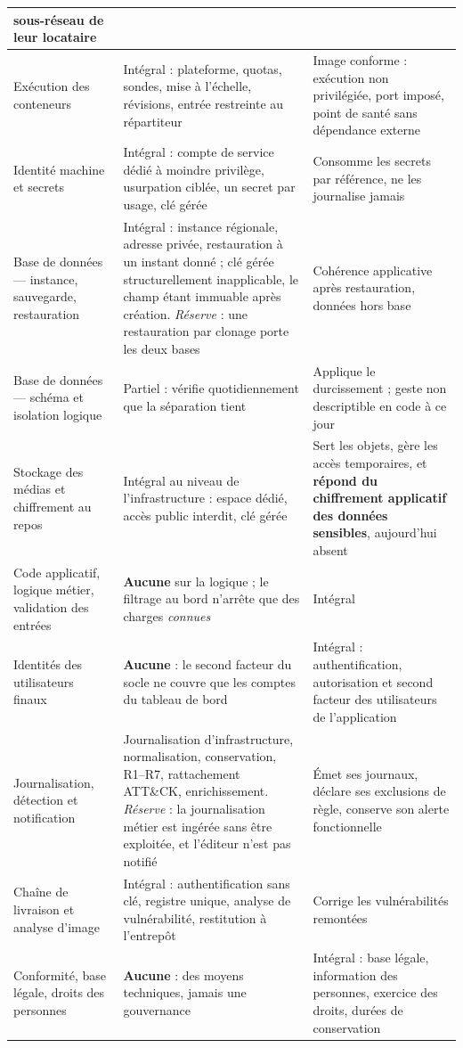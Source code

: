 {\begin{longtable}{|P{2.90cm}|P{6.25cm}|P{5.65cm}|}
sous-réseau de leur locataire \\ \hline
Exécution des conteneurs & Intégral : plateforme, quotas, sondes, mise à l'échelle, révisions,
entrée restreinte au répartiteur & Image conforme : exécution non privilégiée, port imposé, point
de santé sans dépendance externe \\ \hline
Identité machine et secrets & Intégral : compte de service dédié à moindre privilège, usurpation
ciblée, un secret par usage, clé gérée & Consomme les secrets par référence, ne les journalise
jamais \\ \hline
Base de données --- instance, sauvegarde, restauration & Intégral : instance régionale, adresse
privée, restauration à un instant donné ; clé gérée structurellement inapplicable, le champ étant
immuable après création. \emph{Réserve} : une restauration par clonage porte les deux bases &
Cohérence applicative après restauration, données hors base \\ \hline
Base de données --- schéma et isolation logique & Partiel : vérifie quotidiennement que la
séparation tient & Applique le durcissement ; geste non descriptible en code à ce jour \\ \hline
Stockage des médias et chiffrement au repos & Intégral au niveau de l'infrastructure : espace
dédié, accès public interdit, clé gérée & Sert les objets, gère les accès temporaires, et
\textbf{répond du chiffrement applicatif des données sensibles}, aujourd'hui absent \\ \hline
Code applicatif, logique métier, validation des entrées & \textbf{Aucune} sur la logique ; le
filtrage au bord n'arrête que des charges \emph{connues} & Intégral \\ \hline
Identités des utilisateurs finaux & \textbf{Aucune} : le second facteur du socle ne couvre que les
comptes du tableau de bord & Intégral : authentification, autorisation et second facteur des
utilisateurs de l'application \\ \hline
Journalisation, détection et notification & Journalisation d'infrastructure, normalisation,
conservation, R1--R7, rattachement ATT\&CK, enrichissement. \emph{Réserve} : la journalisation
métier est ingérée sans être exploitée, et l'éditeur n'est pas notifié & Émet ses journaux, déclare
ses exclusions de règle, conserve son alerte fonctionnelle \\ \hline
Chaîne de livraison et analyse d'image & Intégral : authentification sans clé, registre unique,
analyse de vulnérabilité, restitution à l'entrepôt & Corrige les vulnérabilités remontées \\ \hline
Conformité, base légale, droits des personnes & \textbf{Aucune} : des moyens techniques, jamais
une gouvernance & Intégral : base légale, information des personnes, exercice des droits, durées de
conservation \\
\hline
\end{longtable}
}

